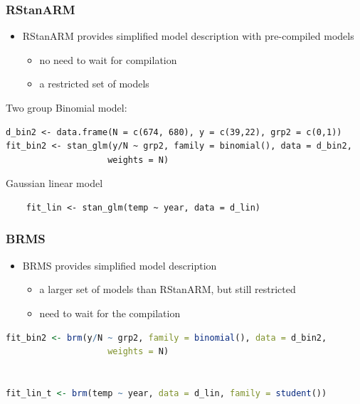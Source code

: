 \documentclass[10pt]{beamer}
\begin{document}
\begin{frame}[fragile]

\frametitle{RStanARM}

  \begin{itemize}
  \item RStanARM provides simplified model description with
    pre-compiled models
    \begin{itemize}
    \item no need to wait for compilation
    \item a restricted set of models
    \end{itemize}
  \end{itemize}

Two group Binomial model:
  {\scriptsize
\begin{lstlisting}
d_bin2 <- data.frame(N = c(674, 680), y = c(39,22), grp2 = c(0,1))
fit_bin2 <- stan_glm(y/N ~ grp2, family = binomial(), data = d_bin2,
                    weights = N)
\end{lstlisting}
  }
    Gaussian linear model
  {\scriptsize
\begin{lstlisting}
    fit_lin <- stan_glm(temp ~ year, data = d_lin)
\end{lstlisting}
  }


\end{frame}


\begin{frame}[fragile]

\frametitle{BRMS}

  \begin{itemize}
  \item BRMS provides simplified model description
    \begin{itemize}
    \item a larger set of models than RStanARM, but still restricted
    \item need to wait for the compilation
    \end{itemize}
  \end{itemize}

  {\scriptsize
\begin{lstlisting}[language=R]
fit_bin2 <- brm(y/N ~ grp2, family = binomial(), data = d_bin2,
                    weights = N)


fit_lin_t <- brm(temp ~ year, data = d_lin, family = student())
\end{lstlisting}
    }

\end{frame}
\end{document}
